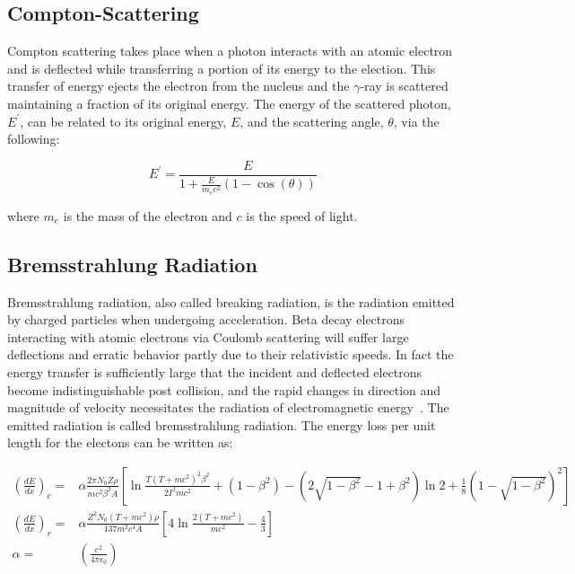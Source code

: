 \documentclass[cnatzke_thesis_proposal.tex]{subfiles}
\begin{document}
\subsection{Compton-Scattering}
\label{sec:compton_scatter}

Compton scattering takes place when a photon interacts with an atomic electron and is deflected while transferring a portion of its energy to the election. 
This transfer of energy ejects the electron from the nucleus and the $\gamma$-ray is scattered maintaining a fraction of its original energy. 
The energy of the scattered photon, $E^{'}$, can be related to its original energy, $E$, and the scattering angle, $\theta$, via the following:

\begin{equation}
    E^{'} = \frac{E}{1 + \frac{E}{m_e c^2}(1 - \cos(\theta))}
\end{equation}

where $m_e$ is the mass of the electron and $c$ is the speed of light. 

\subsection{Bremsstrahlung Radiation}
\label{sec:bremsstrahlung_radiation}
Bremsstrahlung radiation, also called breaking radiation, is the radiation emitted by charged particles when undergoing acceleration. 
Beta decay electrons interacting with atomic electrons via Coulomb scattering will suffer large deflections and erratic behavior partly due to their relativistic speeds.
In fact the energy transfer is sufficiently large that the incident and deflected electrons become indistinguishable post collision, and the rapid changes in direction and magnitude of velocity necessitates the radiation of electromagnetic energy~\cite{krane_introductory_1987}.
The emitted radiation is called bremsstrahlung radiation. 
The energy loss per unit length for the electons can be written as: 

\begin{align}
    \left(\frac{dE}{dx}\right)_c ={}& \alpha \frac{2 \pi N_0 Z \rho}{m c^2 \beta^2 A} \left[ \ln \frac{T(T + m c^2)^2 \beta^2}{2 I^2 m c^2} + (1 - \beta^2) - (2\sqrt{1 - \beta^2} - 1 + \beta^2) \ln2 + \frac{1}{8}(1 - \sqrt{1 - \beta^2})^2 \right] \\
    \left(\frac{dE}{dx}\right)_r ={}& \alpha \frac{Z^2 N_0 (T + m c^2) \rho}{137 m^2 c^4 A} \left[4 \ln \frac{2(T + m c^2)}{m c^2} - \frac{4}{3} \right] \\
    \alpha = {}& \left(\frac{e^2}{4 \pi \epsilon_0}\right)
\end{align}
\end{document}
